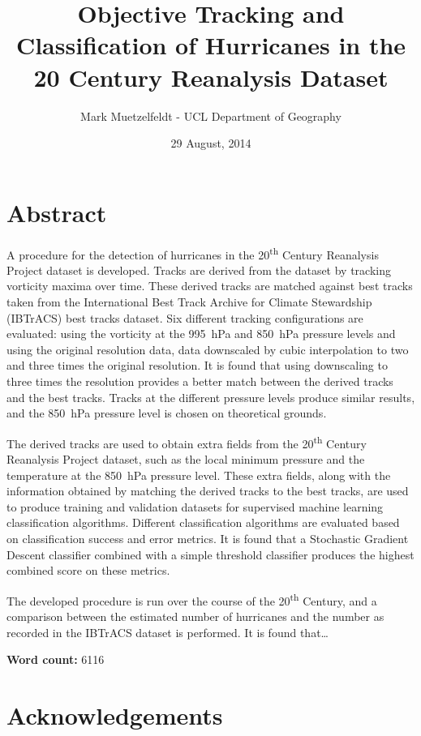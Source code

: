 \documentclass[pdftex,12pt,a4paper]{report}
\title{Objective Tracking and Classification of Hurricanes in the 20\ts{th} Century Reanalysis Dataset}
\author{Mark Muetzelfeldt - UCL Department of Geography}
\date{29 August, 2014}
\newcommand{\ts}{\textsuperscript}
\begin{document}


\onehalfspacing
\section*{Abstract}

A procedure for the detection of hurricanes in the 20\ts{th} Century Reanalysis Project dataset is
developed. Tracks are derived from the dataset by tracking vorticity maxima over time. These derived
tracks are matched against best tracks taken from the International Best Track Archive for Climate
Stewardship (IBTrACS) best tracks dataset. Six different tracking configurations are evaluated:
using the vorticity at the \SI{995}{hPa} and \SI{850}{hPa} pressure levels and using the original
resolution data, data downscaled by cubic interpolation to two and three times the original
resolution. It is found that using downscaling to three times the resolution provides a better match
between the derived tracks and the best tracks. Tracks at the different pressure levels produce
similar results, and the \SI{850}{hPa} pressure level is chosen on theoretical grounds.

The derived tracks are used to obtain extra fields from the 20\ts{th} Century Reanalysis
Project dataset, such as the local minimum pressure and the temperature at the \SI{850}{hPa}
pressure level. These extra fields, along with the information obtained by matching the derived
tracks to the best tracks, are used to produce training and validation datasets for supervised
machine learning classification algorithms. Different classification algorithms are evaluated based
on classification success and error metrics. It is found that a Stochastic Gradient Descent
classifier combined with a simple threshold classifier produces the highest combined score on these
metrics.

The developed procedure is run over the course of the 20\ts{th} Century, and a comparison between
the estimated number of hurricanes and the number as recorded in the IBTrACS dataset is performed.
It is found that\dots

\begin{center}
\textbf{Word count:} 6116 %
\end{center}

\section*{Acknowledgements}
\end{document}
